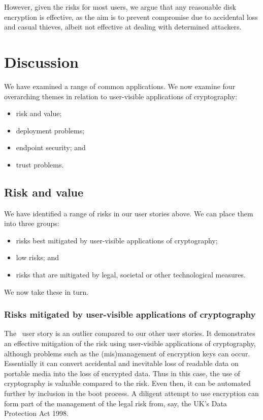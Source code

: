 \documentclass{article}
\begin{document}
However, given the risks for most users, we argue that any
reasonable disk encryption is effective, as the aim is to prevent
compromise due to accidental loss and casual thieves, albeit not effective
at dealing with determined attackers.


\section{Discussion}\label{sec:discussion}

We have examined a range of common applications.  We now examine four
overarching themes in relation to user-visible applications of cryptography:
\begin{itemize}
\item risk and value;
\item deployment problems; 
\item endpoint security; and
\item trust problems.
\end{itemize}

\subsection{Risk and value}\label{sec:riskValue}

We have identified a range of risks in our user stories above.  We can place them
into three groups:
\begin{itemize}
\item risks best mitigated by user-visible applications of cryptography;
\item low risks; and
\item risks that are mitigated by legal, societal or
  other technological measures.
\end{itemize}
We now take these in turn.

\subsubsection{Risks mitigated by user-visible applications of cryptography}

The \USTdata\ user story is an outlier compared to our other user
stories.  It demonstrates an effective mitigation of the risk using
user-visible applications of cryptography, although problems such as the
(mis)management of encryption keys can occur.  Essentially it can
convert accidental and inevitable loss of readable data on portable
media into the loss of encrypted data.  Thus in this case, the use of cryptography is valuable compared to the risk.  Even
then, it can be automated further by inclusion in the boot
process.  A diligent attempt to use encryption can form part of the
management of the legal risk from, say, the UK's Data Protection Act 1998.
\end{document}
